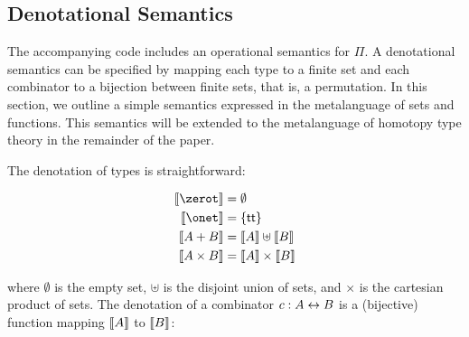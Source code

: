 \subsection{Denotational Semantics}

\noindent The accompanying code includes an operational semantics for $\Pi$. A denotational semantics can be
specified by mapping each type to a finite set and each combinator to a bijection between finite sets, that is, a
permutation. In this section, we outline a simple semantics expressed in the metalanguage of sets and functions. This
semantics will be extended to the metalanguage of homotopy type theory in the remainder of the paper.

The denotation of types is straightforward:

\begin{align*}
  \denot{\zerot}     & = \emptyset                  \\
  \denot{\onet}      & = \{ \Acon{tt} \}            \\
  \denot{A + B}      & = \denot{A} \uplus \denot{B} \\
  \denot{A \times B} & = \denot{A} \times \denot{B}
\end{align*}

where $\emptyset$ is the empty set, $\uplus$ is the disjoint union of sets, and $\times$ is the cartesian product of
sets. The denotation of a combinator $c : A \leftrightarrow B$ is a (bijective) function mapping $\llbracket A\rrbracket$ to $\llbracket B\rrbracket$:

